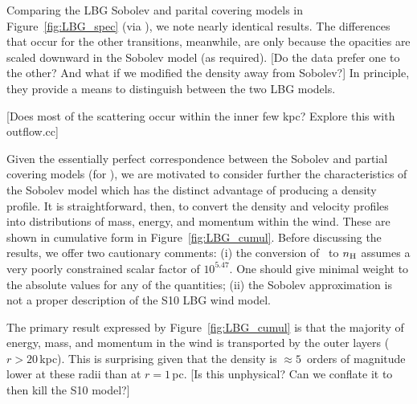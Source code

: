 \documentclass[12pt,preprint]{aastex}
\begin{document}
Comparing the LBG Sobolev and parital covering models in
Figure~\ref{fig:LBG_spec} (via \mgiia), we note nearly identical
results.  The differences that occur for the other transitions,
meanwhile, are only because the opacities are scaled downward in the
Sobolev model (as required).  [Do the data prefer one to the other?
And what if we modified the density away from Sobolev?]
In principle, they provide a means to distinguish between the two LBG
models.  

[Does most of the scattering occur within the inner few kpc? Explore
this with outflow.cc]

Given the essentially perfect correspondence between the Sobolev and
partial covering models (for \mgiia), we are motivated to consider
further the characteristics of the Sobolev model which has the
distinct advantage of producing a 
density profile.  It is straightforward, then, to convert the density and
velocity profiles into distributions of mass, energy, and momentum
within
the wind.  These are shown in cumulative form in
Figure~\ref{fig:LBG_cumul}.  Before discussing the results, we offer
two cautionary comments: (i) the conversion of \nmg\ to $n_{\rm H}$
assumes a very poorly constrained scalar factor of $10^{5.47}$.  One
should give minimal weight to the absolute values for any of the
quantities;
(ii) the Sobolev approximation is not a proper description of the S10
LBG wind model.

The primary result expressed by Figure~\ref{fig:LBG_cumul} is that the
majority of energy, mass, and momentum in the wind is transported by
the outer layers ($r > 20$\,kpc).  This is surprising given that the
density is $\approx 5$~orders of magnitude lower at these radii than
at $r = 1$\,pc.  [Is this unphysical?  Can we conflate it to then kill
the S10 model?]
\end{document}
